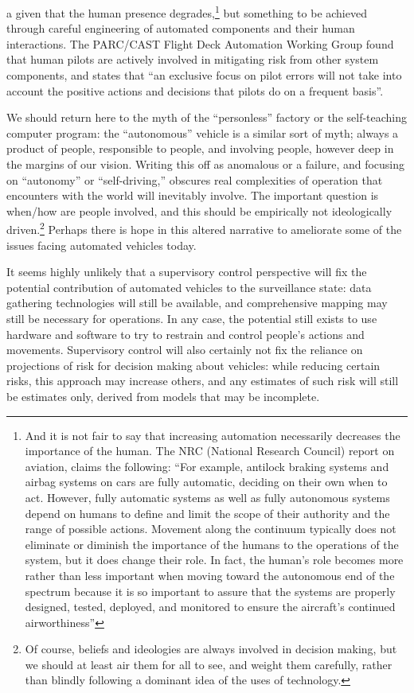 a given that the human presence degrades,\footnote{And it is not fair
  to say that increasing automation necessarily decreases the
  importance of the human. The NRC (National
  Research Council) report on aviation, claims the following: 
``For example, antilock braking systems and airbag systems on cars are
fully automatic, deciding on their own when to act. However, fully
automatic systems as well as fully
autonomous systems depend on humans to define and limit the scope of
their authority and the range of possible actions. Movement along the
continuum typically does not eliminate or diminish the importance
of the humans to the operations of the system, but it does change
their role. In fact, the human's role
becomes more rather than less important when moving toward the
autonomous end of the spectrum
because it is so important to assure that the systems are
properly designed, tested, deployed, and monitored to ensure the
aircraft's continued airworthiness''\cite[p. 14-15]{???-NRCaviation}}
but something to be  
achieved through careful engineering of automated components and their
human interactions. The PARC/CAST Flight Deck Automation Working Group
found that human pilots are actively involved in mitigating risk from
other system components, and states that ``an exclusive focus on pilot
errors will not take into account the positive actions and decisions
that pilots do on a frequent basis''\cite[p. 30]{???-PARC/CAST}. 

We should return here to the myth of the ``personless'' factory or the
self-teaching computer program: the ``autonomous'' vehicle is a
similar sort of myth; always a 
product of people, responsible to people, and involving people,
however deep in the margins of our vision. Writing this off as
anomalous or a failure, and focusing on ``autonomy'' or ``self-driving,''
obscures real complexities of operation that encounters with the world
will inevitably involve. The important question is when/how are people
involved, and this should be empirically not ideologically
driven.\footnote{Of course, beliefs and ideologies are always involved
  in decision making, but we should at least air them for all to see,
  and weight them carefully, rather than blindly following a dominant
  idea of the uses of technology.}
Perhaps there is hope in this altered narrative to ameliorate some of
the issues facing automated vehicles today. 

It seems highly unlikely that a supervisory control perspective will
fix the potential contribution of automated vehicles to the
surveillance state:  data gathering technologies will still be
available, and comprehensive mapping may still be necessary for
operations. In any case, the potential still exists to use hardware
and software to try to restrain and control people's actions and
movements. Supervisory control will also certainly not fix the
reliance on projections of risk for decision making about vehicles:
while reducing certain risks, this approach may increase others, and
any estimates of such risk will still be estimates only, derived from
models that may be incomplete.

